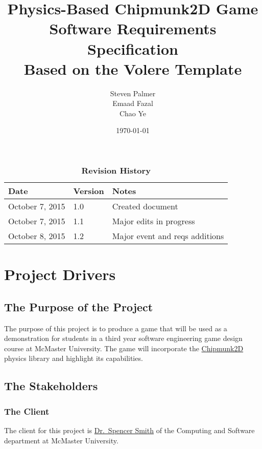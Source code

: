 \documentclass[12pt, titlepage]{article}
\begin{document}
\title{\bf Physics-Based Chipmunk2D Game\\[\baselineskip]\Large Software Requirements Specification\\[2\baselineskip] \large Based on the Volere Template}
\author{Steven Palmer\\Emaad Fazal\\Chao Ye}
\date{\today}
	
\maketitle

\tableofcontents
\listoftables
\listoffigures

\begin{table}[bp]
\caption*{\bf Revision History}
\begin{tabularx}{\textwidth}{p{3cm}p{2cm}X}
\toprule {\bf Date} & {\bf Version} & {\bf Notes}\\
\midrule
October 7, 2015 & 1.0 & Created document\\
October 7, 2015 & 1.1 & Major edits in progress\\
October 8, 2015 & 1.2 & Major event and reqs additions\\
\bottomrule
\end{tabularx}
\end{table}

\newpage
{}
\section{Project Drivers}
\subsection{The Purpose of the Project}
The purpose of this project is to produce a game that will be used as a demonstration for students in a third year software engineering game design course at McMaster University.  The game will incorporate the \href{https://chipmunk-physics.net/}{Chipmunk2D} physics library and highlight its capabilities.
\subsection{The Stakeholders}
\subsubsection{The Client}
The client for this project is \href{http://www.cas.mcmaster.ca/~smiths/}{Dr.~Spencer Smith} of the Computing and Software department at McMaster University.
\end{document}
